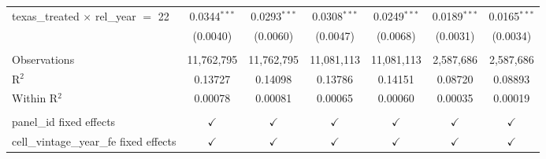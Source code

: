 \begin{tabular}{lcccccc}
   texas\_treated $\times$ rel\_year $=$ 22     & 0.0344$^{***}$ & 0.0293$^{***}$ & 0.0308$^{***}$ & 0.0249$^{***}$ & 0.0189$^{***}$  & 0.0165$^{***}$\\   
                                                & (0.0040)       & (0.0060)       & (0.0047)       & (0.0068)       & (0.0031)        & (0.0034)\\   
    \\
   Observations                                 & 11,762,795     & 11,762,795     & 11,081,113     & 11,081,113     & 2,587,686       & 2,587,686\\  
   R$^2$                                        & 0.13727        & 0.14098        & 0.13786        & 0.14151        & 0.08720         & 0.08893\\  
   Within R$^2$                                 & 0.00078        & 0.00081        & 0.00065        & 0.00060        & 0.00035         & 0.00019\\  
    \\
   panel\_id fixed effects                      & $\checkmark$   & $\checkmark$   & $\checkmark$   & $\checkmark$   & $\checkmark$    & $\checkmark$\\   
   cell\_vintage\_year\_fe fixed effects        & $\checkmark$   & $\checkmark$   & $\checkmark$   & $\checkmark$   & $\checkmark$    & $\checkmark$\\   
   \bottomrule
\end{tabular}
\par\endgroup


